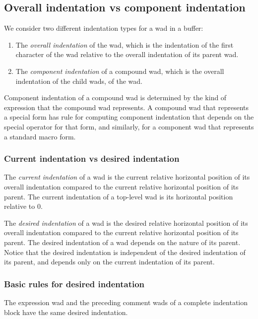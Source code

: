 \subsection{Overall indentation vs component indentation}

We consider two different indentation types for a wad in a buffer:

\begin{enumerate}
\item The \emph{overall indentation} of the wad, which is the
  indentation of the first character of the wad relative to the
  overall indentation of its parent wad.
\item The \emph{component indentation} of a compound wad, which
  is the overall indentation of the child wads, of the wad.
\end{enumerate}

Component indentation of a compound wad is determined by the kind of
expression that the compound wad represents.  A compound wad that
represents a special form has rule for computing component indentation
that depends on the special operator for that form, and similarly, for
a component wad that represents a standard macro form.

\subsubsection{Current indentation vs desired indentation}

The \emph{current indentation} of a wad is the current relative
horizontal position of its overall indentation compared to the current
relative horizontal position of its parent.  The current indentation
of a top-level wad is its horizontal position relative to 0.

The \emph{desired indentation} of a wad is the desired relative
horizontal position of its overall indentation compared to the current
relative horizontal position of its parent.  The desired indentation
of a wad depends on the nature of its parent.  Notice that the desired
indentation is independent of the desired indentation of its parent,
and depends only on the current indentation of its parent.

\subsubsection{Basic rules for desired indentation}

The expression wad and the preceding comment wads of a complete
indentation block have the same desired indentation.

